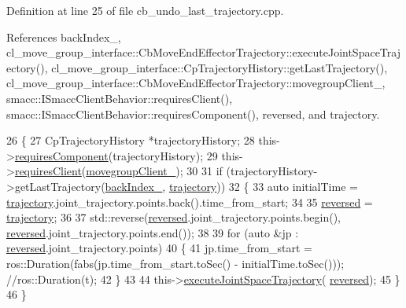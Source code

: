 Definition at line 25 of file cb\+\_\+undo\+\_\+last\+\_\+trajectory.\+cpp.



References back\+Index\+\_\+, cl\+\_\+move\+\_\+group\+\_\+interface\+::\+Cb\+Move\+End\+Effector\+Trajectory\+::execute\+Joint\+Space\+Trajectory(), cl\+\_\+move\+\_\+group\+\_\+interface\+::\+Cp\+Trajectory\+History\+::get\+Last\+Trajectory(), cl\+\_\+move\+\_\+group\+\_\+interface\+::\+Cb\+Move\+End\+Effector\+Trajectory\+::movegroup\+Client\+\_\+, smacc\+::\+I\+Smacc\+Client\+Behavior\+::requires\+Client(), smacc\+::\+I\+Smacc\+Client\+Behavior\+::requires\+Component(), reversed, and trajectory.


\begin{DoxyCode}
26     \{
27         CpTrajectoryHistory *trajectoryHistory;
28         this->\hyperlink{classsmacc_1_1ISmaccClientBehavior_a19c6d658c8e809bb93bfdc9b639a3ac3}{requiresComponent}(trajectoryHistory);
29         this->\hyperlink{classsmacc_1_1ISmaccClientBehavior_a32b16e99e3b4cb289414203dc861a440}{requiresClient}(\hyperlink{classcl__move__group__interface_1_1CbMoveEndEffectorTrajectory_aea650d3e7836125b32be97392b71a7f3}{movegroupClient\_});
30 
31         \textcolor{keywordflow}{if} (trajectoryHistory->getLastTrajectory(\hyperlink{classcl__move__group__interface_1_1CbUndoLastTrajectory_a07b581e873b30625f06aea437a126d29}{backIndex\_}, 
      \hyperlink{classcl__move__group__interface_1_1CbUndoLastTrajectory_ad1fbe6bea21a14596b5c4a6ebf4c775b}{trajectory}))
32         \{
33             \textcolor{keyword}{auto} initialTime = \hyperlink{classcl__move__group__interface_1_1CbUndoLastTrajectory_ad1fbe6bea21a14596b5c4a6ebf4c775b}{trajectory}.joint\_trajectory.points.back().time\_from\_start;
34 
35             \hyperlink{classcl__move__group__interface_1_1CbUndoLastTrajectory_ad61c8810d7f31a22f3d75251887938a8}{reversed} = \hyperlink{classcl__move__group__interface_1_1CbUndoLastTrajectory_ad1fbe6bea21a14596b5c4a6ebf4c775b}{trajectory};
36 
37             std::reverse(\hyperlink{classcl__move__group__interface_1_1CbUndoLastTrajectory_ad61c8810d7f31a22f3d75251887938a8}{reversed}.joint\_trajectory.points.begin(), 
      \hyperlink{classcl__move__group__interface_1_1CbUndoLastTrajectory_ad61c8810d7f31a22f3d75251887938a8}{reversed}.joint\_trajectory.points.end());
38 
39             \textcolor{keywordflow}{for} (\textcolor{keyword}{auto} &jp : \hyperlink{classcl__move__group__interface_1_1CbUndoLastTrajectory_ad61c8810d7f31a22f3d75251887938a8}{reversed}.joint\_trajectory.points)
40             \{
41                 jp.time\_from\_start = ros::Duration(fabs(jp.time\_from\_start.toSec() - initialTime.toSec()));
       \textcolor{comment}{//ros::Duration(t);}
42             \}
43 
44             this->\hyperlink{classcl__move__group__interface_1_1CbMoveEndEffectorTrajectory_a3a75fa185c62591e1869427650338a32}{executeJointSpaceTrajectory}(
      \hyperlink{classcl__move__group__interface_1_1CbUndoLastTrajectory_ad61c8810d7f31a22f3d75251887938a8}{reversed});
45         \}
46     \}
\end{DoxyCode}
